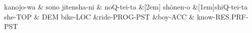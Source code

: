 \documentclass{standalone}
\begin{document}
 


\begin{dependency}[theme = simple, arc edge, arc angle=70, text only label, label style={above, font = \footnotesize} ]
\begin{deptext}[column sep=.1ex, row sep = .15ex]
	kanojo-wa \&  sono jitensha-ni \& noQ-tei-ta \&[2em] sh\={o}nen-o  \&[1em]shiQ-tei-ta \\
	she-TOP           \& DEM bike-LOC	\&ride-PROG-PST	\&boy-ACC  \& know-RES.PRF-PST\\
\end{deptext}
\end{dependency}
\end{document}

